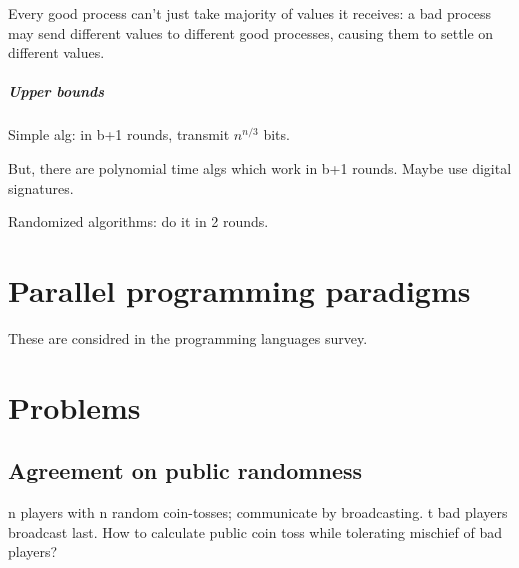 \documentclass[oneside, article]{memoir}
\begin{document}
Every good process can't just take majority of values it receives: a bad process may send different values to different good processes, causing them to settle on different values.

\paragraph*{Upper bounds}
Simple alg: in b+1 rounds, transmit $n^{n/3}$ bits.

But, there are polynomial time algs which work in b+1 rounds. Maybe use digital signatures.

Randomized algorithms: do it in 2 rounds.

\chapter{Parallel programming paradigms}
These are considred in the programming languages survey.

\chapter{Problems}
\section{Agreement on public randomness}
n players with n random coin-tosses; communicate by broadcasting. t bad players broadcast last. How to calculate public coin toss while tolerating mischief of bad players?


% 
% 
\end{document}
